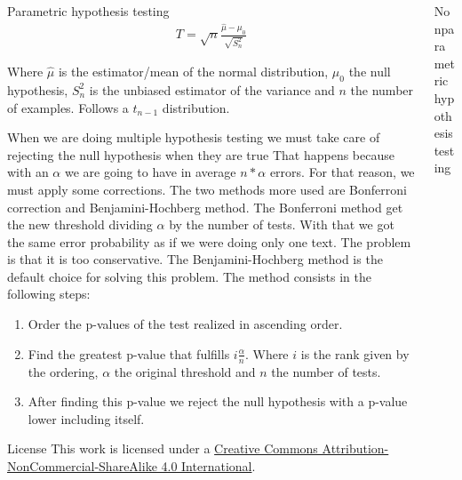 \documentclass{beamer}
\begin{document}
\begin{columns}
\begin{column}{0.3\textwidth}
\begin{block}{Parametric hypothesis testing}
\begin{align*}
    T = \sqrt{n} \frac{\hat{\mu} - \mu_0}{\sqrt{S^2_n}}
\end{align*}

Where $\hat{\mu}$ is the estimator/mean of the normal distribution, $\mu_0$ the null hypothesis, $S^2_n$ is the unbiased estimator of the variance and $n$ the number of examples. Follows a $t_{n-1}$ distribution.
\newline

When we are doing multiple hypothesis testing we must take care of rejecting the null hypothesis when they are true That happens because with an $\alpha$ we are going to have in average $n*\alpha$ errors. For that reason, we must apply some corrections. The two methods more used are Bonferroni correction and Benjamini-Hochberg method. 
\newline
The Bonferroni method get the new threshold dividing $\alpha$ by the number of tests. With that we got the same error probability as if we were doing only one text. The problem is that it is too conservative.
\newline
The Benjamini-Hochberg method is the default choice for solving this problem. The method consists in the following steps: 

\begin{enumerate}
    \item Order the p-values of the test realized in ascending order.
    \item Find the greatest p-value that fulfills $i \frac{\alpha}{n}$. Where $i$ is the rank given by the ordering, $\alpha$ the original threshold and $n$ the number of tests.
    \item After finding this p-value we reject the null hypothesis with a p-value lower including itself. 
\end{enumerate}

\end{block} 

\begin{block}{License}
This work is licensed under a \href{https://creativecommons.org/licenses/by-nc-sa/4.0/}{Creative Commons Attribution-NonCommercial-ShareAlike 4.0 International}. \ccbyncsa
\end{block}

\end{column}
\begin{column}{0.3\textwidth}

\begin{block}{Nonparametric hypothesis testing}


\end{block}
\end{column}
\end{columns}
\end{document}
